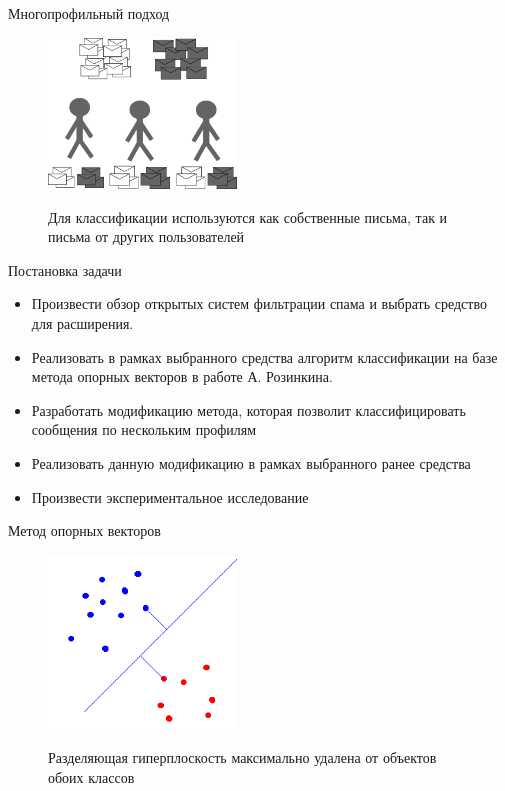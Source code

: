 \documentclass{beamer}
\begin{document}
\begin{frame}{Многопрофильный подход}
\begin{figure}[h]
\begin{center}
    \includegraphics[width=5cm]{img/multiprofile}
\end{center}
    Для классификации используются как собственные письма, так и письма от других пользователей
\end{figure}
\end{frame}
\begin{frame}{Постановка задачи}
\begin{itemize}
	\item Произвести обзор открытых систем фильтрации спама и выбрать средство для расширения.
    \item Реализовать в рамках выбранного средства алгоритм классификации на базе метода опорных векторов в работе А. Розинкина. 
    \item Разработать модификацию метода, которая позволит классифицировать сообщения по нескольким профилям
	\item Реализовать данную модификацию в рамках выбранного ранее средства
    \item Произвести экспериментальное исследование
\end{itemize}
\end{frame}

\begin{frame}{Метод опорных векторов}
\begin{figure}[h]
\begin{center}
    \includegraphics[width=5cm]{../img/svm}
\end{center}
    Разделяющая гиперплоскость максимально удалена от объектов обоих классов
\end{figure}
\end{frame}
\end{document}

